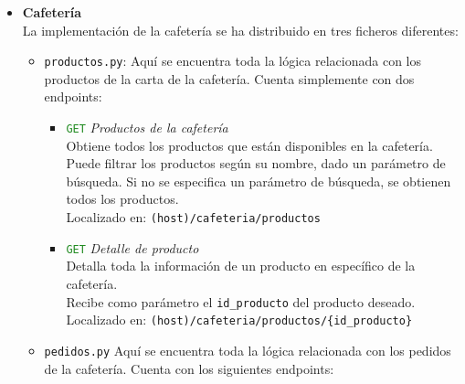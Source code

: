 \documentclass[12pt]{report}
\begin{document}
\begin{itemize}
    \item \textbf{Cafetería}\\
    La implementación de la cafetería se ha distribuido en tres ficheros diferentes:
    \begin{itemize}
        \item \texttt{productos.py}:
        Aquí se encuentra toda la lógica relacionada con los productos de la carta de la cafetería. Cuenta simplemente con dos endpoints:
        \begin{itemize}
            \item \textcolor{ForestGreen}{\texttt{GET}} \textit{Productos de la cafetería}\\
            Obtiene todos los productos que están disponibles en la cafetería. Puede filtrar los productos según su nombre, dado un parámetro de búsqueda. Si no se especifica un parámetro de búsqueda, se obtienen todos los productos.\\
            Localizado en: \texttt{(host)/cafeteria/productos}
            \item \textcolor{ForestGreen}{\texttt{GET}} \textit{Detalle de producto}\\
            Detalla toda la información de un producto en específico de la cafetería.\\
            Recibe como parámetro el \texttt{id\_producto} del producto deseado.\\
            Localizado en: \texttt{(host)/cafeteria/productos/\{id\_producto\}}
        \end{itemize}

    
        \item \texttt{pedidos.py}
        Aquí se encuentra toda la lógica relacionada con los pedidos de la cafetería. Cuenta con los siguientes endpoints:
        \begin{itemize}


\end{itemize}
\end{itemize}
\end{itemize}
\end{document}
